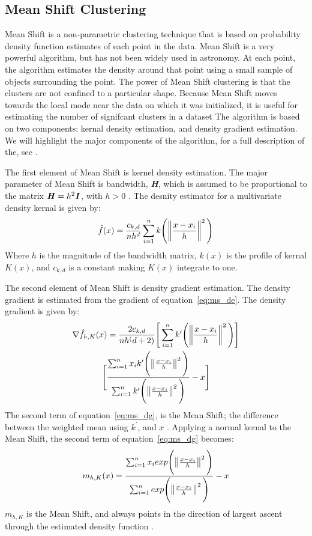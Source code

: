 \subsection{Mean Shift Clustering} 
Mean Shift is a non-parametric clustering technique that is based on probability density function estimates of each point in the data. %
Mean Shift is a very powerful algorithm, but has not been widely used in astronomy. %
At each point, the algorithm estimates the density around that point using a small sample of objects surrounding the point.
The power of Mean Shift clustering is that the clusters are not confined to a particular shape.
Because Mean Shift moves towards the local mode near the data on which it was initialized, it is useful for estimating the number of signifcant clusters in a dataset \citet{comanciciu02}
The algorithm is based on two components: kernal density estimation, and density gradient estimation.
We will highlight the major components of the algorithm, for a full description of the, see \citet{vatturi09}.

The first element of Mean Shift is kernel density estimation. 
The major parameter of Mean Shift is bandwidth, \textbf{\textit{H}}, which is assumed to be proportional to the matrix $\textbf{\textit{H}} = h^2\textbf{\textit{I}}$, with $h>0$ \citet{vatturi09}.
The desnity estimator for a multivariate density kernal is given by: 
\begin{equation} 
\label{eq:ms_de}
\hat{f}(x) = \frac{c_{k,d}}{nh^d} \sum_{i=1}^n k\Bigg( \norm{\frac{x-x_{i}}{h}}^2 \Bigg)
\end{equation}
Where $h$ is the magnitude of the bandwidth matrix, $k(x)$ is the profile of kernal $K(x)$, and $c_{k,d}$ is a constant making $K(x)$ integrate to one\citet{vatturi09}.

The second element of Mean Shift is density gradient estimation. 
The density gradient is estimated from the gradient of equation~\ref{eq:ms_de}\citet{vatturi09}.
The density gradient is given by: 
\begin{multline}
\label{eq:ms_dg}
\nabla\hat{f}_{h,K}(x) = \frac{2c_{k,d}}{nh^(d+2)} \Bigg[ \sum_{i=1}^n k^{\prime} \Bigg( \norm{\frac{x-x_{i}}{h}}^2 \Bigg) \Bigg] \\ \Bigg[\frac{\sum_{i=1}^n x_{i}k^{\prime} \Bigg( \norm{\frac{x-x_{i}}{h}}^2 \Bigg)}{\sum_{i=1}^n k^{\prime} \Bigg( \norm{\frac{x-x_{i}}{h}}^2 \Bigg)} - x \Bigg]
\end{multline}
The second term of equation~\ref{eq:ms_dg}, is the Mean Shift; the difference between the weighted mean using $k^{\prime}$, and $x$ \citet{vatturi09}.
Applying a normal kernal to the Mean Shift, the second term of equation~\ref{eq:ms_dg} becomes: 
\begin{equation} 
\label{eq:ms_sh}
m_{h,K}(x) = \frac{\sum_{i=1}^n x_{i} exp \Bigg(\norm{\frac{x-x_{i}}{h}}^2 \Bigg)}{\sum_{i=1}^n exp \Bigg(\norm{\frac{x-x_{i}}{h}}^2 \Bigg)} - x
\end{equation}
$m_{h,K}$ is the Mean Shift, and always points in the direction of largest ascent through the estimated density function \citet{vatturi09}.

